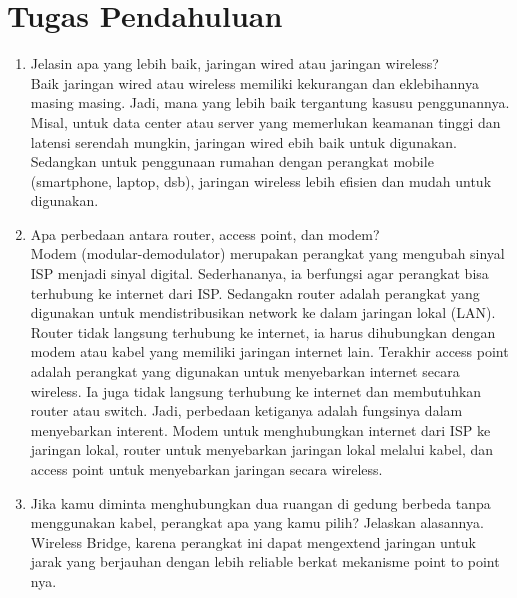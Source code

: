\section{Tugas Pendahuluan}
\begin{enumerate}
	\item Jelasin apa yang lebih baik, jaringan wired atau jaringan wireless? \\
	Baik jaringan wired atau wireless memiliki kekurangan dan eklebihannya masing masing. Jadi, mana yang lebih baik tergantung kasusu penggunannya. Misal, untuk data center atau server yang memerlukan keamanan tinggi dan latensi serendah mungkin, jaringan wired ebih baik untuk digunakan. Sedangkan untuk penggunaan rumahan dengan perangkat mobile (smartphone, laptop, dsb), jaringan wireless lebih efisien dan mudah untuk digunakan.
	\item Apa perbedaan antara router, access point, dan modem?\\
	Modem (modular-demodulator) merupakan perangkat yang mengubah sinyal ISP menjadi sinyal digital. Sederhananya, ia berfungsi agar perangkat bisa terhubung ke internet dari ISP. Sedangakn router adalah perangkat yang digunakan untuk mendistribusikan network ke dalam jaringan lokal (LAN). Router tidak langsung terhubung ke internet, ia harus dihubungkan dengan modem atau kabel yang memiliki jaringan internet lain. Terakhir access point adalah perangkat yang digunakan untuk menyebarkan internet secara wireless. Ia juga tidak langsung terhubung ke internet dan membutuhkan router atau switch. Jadi, perbedaan ketiganya adalah fungsinya dalam menyebarkan interent. Modem untuk menghubungkan internet dari ISP ke jaringan lokal, router untuk menyebarkan jaringan lokal melalui kabel, dan access point untuk menyebarkan jaringan secara wireless.
	\item Jika kamu diminta menghubungkan dua ruangan di gedung berbeda tanpa menggunakan kabel, perangkat apa yang kamu pilih? Jelaskan alasannya.\\
	Wireless Bridge, karena perangkat ini dapat mengextend jaringan untuk jarak yang berjauhan dengan lebih reliable berkat mekanisme point to point nya.
\end{enumerate}